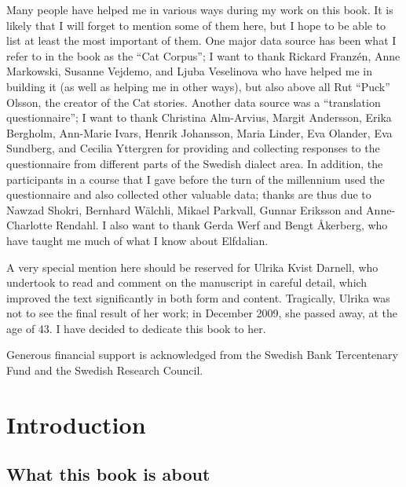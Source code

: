 \begin{styleBodytextC}
Many people have helped me in various ways during my work on this book. It is likely that I will forget to mention some of them here, but I hope to be able to list at least the most important of them. One major data source has been what I refer to in the book as the “Cat Corpus”; I want to thank Rickard Franzén, Anne Markowski, Susanne Vejdemo, and Ljuba Veselinova who have helped me in building it (as well as helping me in other ways), but also above all Rut “Puck” Olsson, the creator of the Cat stories. Another data source was a “translation questionnaire”; I want to thank Christina Alm-Arvius, Margit Andersson, Erika Bergholm, Ann-Marie Ivars, Henrik Johansson, Maria Linder, Eva Olander, Eva Sundberg, and Cecilia Yttergren for providing and collecting responses to the questionnaire from different parts of the Swedish dialect area. In addition, the participants in a course that I gave before the turn of the millennium used the questionnaire and also collected other valuable data; thanks are thus due to Nawzad Shokri, Bernhard Wälchli, Mikael Parkvall, Gunnar Eriksson and Anne-Charlotte Rendahl. I also want to thank Gerda Werf and Bengt Åkerberg, who have taught me much of what I know about Elfdalian. 

\end{styleBodytextC}

\begin{styleBodytextC}
A very special mention here should be reserved for Ulrika Kvist Darnell, who undertook to read and comment on the manuscript in careful detail, which improved the text significantly in both form and content. Tragically, Ulrika was not to see the final result of her work; in December 2009, she passed away, at the age of 43. I have decided to dedicate this book to her. 

\end{styleBodytextC}

\begin{styleBodytextC}
Generous financial support is acknowledged from the Swedish Bank Tercentenary Fund and the Swedish Research Council.

\end{styleBodytextC}

\chapter[Introduction]{Introduction}
\section{\rmfamily\bfseries What this book is about}

